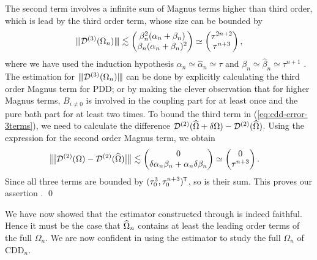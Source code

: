 \documentclass[pra,reprint,superscriptaddress]{revtex4-2}
\begin{document}
The second term involves a infinite sum of Magnus terms higher than third order, which is lead by the third order term, whose 
size can be bounded by 
\begin{equation*}
\opnorm{\cD\up{3}(\Omega_n)}\lesssim
\begin{pmatrix}
\beta_{n}^2 (\alpha_{n}+\beta_{n}) \\
\beta_{n} (\alpha_{n}+\beta_{n})^2
\end{pmatrix}
\simeq \begin{pmatrix}
\tau^{2n+2}\\
\tau^{n+3}
\end{pmatrix},
\end{equation*}
where we have used the induction hypothesis 
$\alpha_{n}\simeq\widehat\alpha_{n}\simeq\tau$ and 
$\beta_{n}\simeq\widehat\beta_{n}\simeq \tau^{n+1}$ .
The estimation for $\opnorm{\cD\up{3}(\Omega_n)}$ can be done by explicitly calculating the third order Magnus term for PDD; or by making  the clever observation that for higher Magnus terms, 
$B_{i\neq0}$ is involved in the coupling part for at least once and 
 the pure bath part for at least two times.  
To bound the third term in (\ref{eq:cdd-error-3terms}), we need to calculate the difference $\mathcal{D}^{(2)}(\widehat{\Omega}+\delta\Omega) - \mathcal{D}^{(2)}(\widehat{\Omega})$.
Using the expression for the second order Magnus term, we obtain
\begin{equation*}
\begin{split}
&\opnorm[\big]{\cD\up{2}(\Omega) - \cD\up{2}(\Ohat)} 
\lesssim\begin{pmatrix}
    0\\
    \delta\alpha_{n} \beta_{n} +\alpha_{n} \delta\beta_{n}
\end{pmatrix}\simeq
\begin{pmatrix}
    0\\
    \tau^{n+3}
\end{pmatrix}.
\end{split}
\end{equation*}
Since all three terms are bounded by $(\tau_0^3, \tau_0^{n+3})^{\mkern-1.5mu\mathsf{T}}$, so is their sum. This proves our assertion . \qed

\smallskip

We have now showed that the estimator constructed through 
 is indeed faithful.
Hence it must be the case that $\widehat{\Omega}_n$ contains at least the leading order terms of the full $\Omega_n$. We are now confident in using the estimator  to study the full $\Omega_{n}$ of $\mathrm{CDD}_n$. 








\appendix
\end{document}
